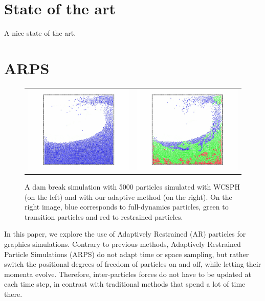 \documentclass[11pt, oneside, a4paper]{memoir}
\begin{document}
\chapter{State of the art}
A nice state of the art.

\chapter{ARPS}

\begin{figure}[!h]
    \begin{tabular}{cc}
        \includegraphics[width=0.4\linewidth]{images/arps-vriphys2013/ReposSPHClassique1.jpg} &
        \includegraphics[width=0.4\linewidth]{images/arps-vriphys2013/ReposSPHARPSColor1.jpg}
    \end{tabular}
 \centering
 \caption{ A dam break simulation with 5000 particles simulated with WCSPH (on the left)
 and with our adaptive method (on the right). On the right image, blue corresponds to full-dynamics particles, green to transition particles and red to restrained particles.}
\label{fig:teaser}
\end{figure}

In this paper, we explore the use of Adaptively Restrained (AR) particles for graphics simulations. Contrary to previous methods,
Adaptively Restrained Particle Simulations (ARPS) do not adapt time or space sampling, but rather switch the positional degrees of freedom of particles on and off, while letting their momenta evolve. Therefore, inter-particles forces do not have to be updated at each time step, in contrast with traditional methods that spend a lot of time there.
\end{document}
